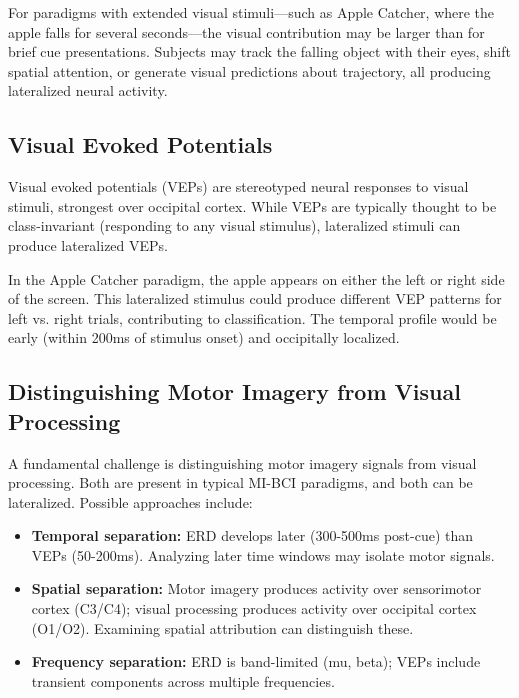 For paradigms with extended visual stimuli—such as Apple Catcher, where the apple falls for several seconds—the visual contribution may be larger than for brief cue presentations. Subjects may track the falling object with their eyes, shift spatial attention, or generate visual predictions about trajectory, all producing lateralized neural activity.


\subsection{Visual Evoked Potentials}
\label{subsec:rw_veps}

Visual evoked potentials (VEPs) are stereotyped neural responses to visual stimuli, strongest over occipital cortex. While VEPs are typically thought to be class-invariant (responding to any visual stimulus), lateralized stimuli can produce lateralized VEPs.

In the Apple Catcher paradigm, the apple appears on either the left or right side of the screen. This lateralized stimulus could produce different VEP patterns for left vs. right trials, contributing to classification. The temporal profile would be early (within 200ms of stimulus onset) and occipitally localized.


\subsection{Distinguishing Motor Imagery from Visual Processing}
\label{subsec:rw_distinguishing}

A fundamental challenge is distinguishing motor imagery signals from visual processing. Both are present in typical MI-BCI paradigms, and both can be lateralized. Possible approaches include:

\begin{itemize}
    \item \textbf{Temporal separation:} ERD develops later (300-500ms post-cue) than VEPs (50-200ms). Analyzing later time windows may isolate motor signals.
    
    \item \textbf{Spatial separation:} Motor imagery produces activity over sensorimotor cortex (C3/C4); visual processing produces activity over occipital cortex (O1/O2). Examining spatial attribution can distinguish these.
    
    \item \textbf{Frequency separation:} ERD is band-limited (mu, beta); VEPs include transient components across multiple frequencies.
\end{itemize}

